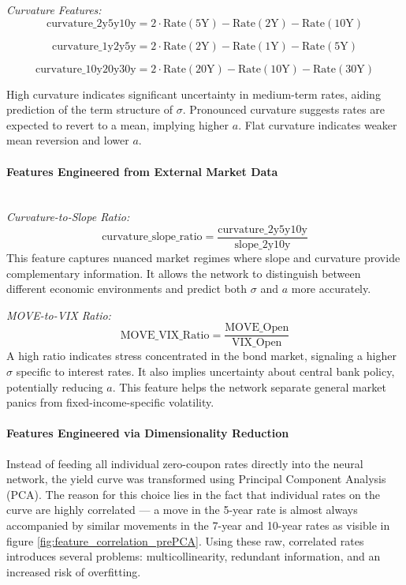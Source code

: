 {\textit{Curvature Features:}
\begin{equation}
	\text{curvature\_2y5y10y} = 2 \cdot \text{Rate}(5\text{Y}) - \text{Rate}(2\text{Y}) - \text{Rate}(10\text{Y})
\end{equation}

\begin{equation}
	\text{curvature\_1y2y5y} = 2 \cdot \text{Rate}(2\text{Y}) - \text{Rate}(1\text{Y}) - \text{Rate}(5\text{Y})
\end{equation}

\begin{equation}
	\text{curvature\_10y20y30y} = 2 \cdot \text{Rate}(20\text{Y}) - \text{Rate}(10\text{Y}) - \text{Rate}(30\text{Y})
\end{equation}

High curvature indicates significant uncertainty in medium-term rates, aiding prediction of the term structure of \(\sigma\). Pronounced curvature suggests rates are expected to revert to a mean, implying higher \(a\). Flat curvature indicates weaker mean reversion and lower \(a\).

\paragraph{Features Engineered from External Market Data} \mbox{}\\
\textit{Curvature-to-Slope Ratio:}
\begin{equation}
	\text{curvature\_slope\_ratio} = \frac{\text{curvature\_2y5y10y}}{\text{slope\_2y10y}}
\end{equation}
This feature captures nuanced market regimes where slope and curvature provide complementary information. It allows the network to distinguish between different economic environments and predict both \(\sigma\) and \(a\) more accurately.

\textit{MOVE-to-VIX Ratio:}
\begin{equation}
	\text{MOVE\_VIX\_Ratio} = \frac{\text{MOVE\_Open}}{\text{VIX\_Open}}
\end{equation}
A high ratio indicates stress concentrated in the bond market, signaling a higher \(\sigma\) specific to interest rates. It also implies uncertainty about central bank policy, potentially reducing \(a\). This feature helps the network separate general market panics from fixed-income-specific volatility.

\paragraph{Features Engineered via Dimensionality Reduction}
Instead of feeding all individual zero-coupon rates directly into the neural network, the yield curve was transformed using Principal Component Analysis (PCA). The reason for this choice lies in the fact that individual rates on the curve are highly correlated — a move in the 5-year rate is almost always accompanied by similar movements in the 7-year and 10-year rates as visible in figure \ref{fig:feature_correlation_prePCA}. Using these raw, correlated rates introduces several problems: multicollinearity, redundant information, and an increased risk of overfitting.

}
